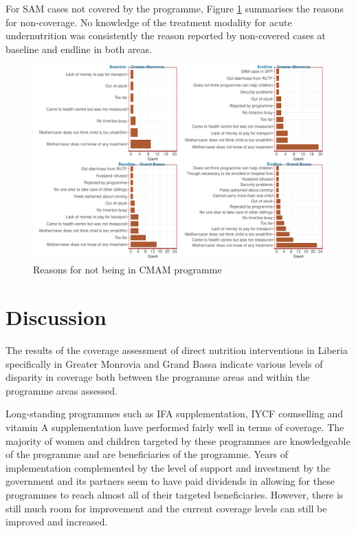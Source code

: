 \documentclass[12pt,a4paper]{article}
\begin{document}
For SAM cases not covered by the programme, Figure \ref{fig:cmam2plot} summarises the reasons for non-coverage. No knowledge of the treatment modality for acute undernutrition was consistently the reason reported by non-covered cases at baseline and endline in both areas.

\begin{figure}[H]

{\centering \includegraphics{liberiaCoverageFinalReport_files/figure-latex/cmam2plot-1} 

}

\caption{Reasons for not being in CMAM programme}\label{fig:cmam2plot}
\end{figure}

\hypertarget{discussion}{%
\section{Discussion}\label{discussion}}

The results of the coverage assessment of direct nutrition interventions in Liberia specifically in Greater Monrovia and Grand Bassa indicate various levels of disparity in coverage both between the programme areas and within the programme areas assessed.

Long-standing programmes such as IFA supplementation, IYCF counselling and vitamin A supplementation have performed fairly well in terms of coverage. The majority of women and children targeted by these programmes are knowledgeable of the programme and are beneficiaries of the programme. Years of implementation complemented by the level of support and investment by the government and its partners seem to have paid dividends in allowing for these programmes to reach almost all of their targeted beneficiaries. However, there is still much room for improvement and the current coverage levels can still be improved and increased.
\end{document}
